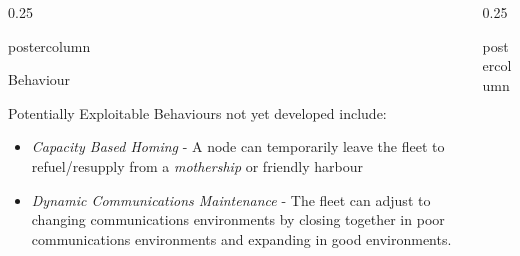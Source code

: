 \documentclass[final,hyperref={pdfpagelabels=false}]{beamer}
\newlength{\columnheight}
\def\colwidth{0.25\linewidth}
\begin{document}
\begin{frame}[fragile]
\begin{columns}[t]
\begin{column}{\colwidth}
\begin{beamercolorbox}[center,wd=\textwidth]{postercolumn}
\begin{minipage}[T]{.98\textwidth}
{\begin{block}{Behaviour}
              \vspace{0.5\baselineskip}

              Potentially Exploitable Behaviours not yet developed include:
              \begin{itemize}
                \item \emph{Capacity Based Homing} - A node can temporarily leave the fleet to refuel/resupply from a \emph{mothership} or friendly harbour
                \item \emph{Dynamic Communications Maintenance} - The fleet can adjust to changing communications environments by closing together in poor communications environments and expanding in good environments.
              \end{itemize}
            \end{block}
          }
        \end{minipage}
      \end{beamercolorbox}
    \end{column}

    \begin{column}{\colwidth}
      \begin{beamercolorbox}[center,wd=\textwidth]{postercolumn}
        \begin{minipage}[T]{.98\textwidth} %
          \parbox[t][\columnheight]{\textwidth}{ %
            
}
\end{minipage}
\end{beamercolorbox}
\end{column}
\end{columns}
\end{frame}
\end{document}
